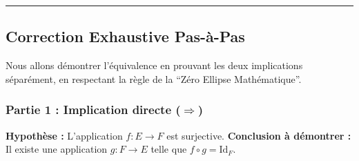 \documentclass[12pt,a4paper]{report}
\begin{document}
\begin{center}\rule{0.5\linewidth}{0.5pt}\end{center}

\subsection{Correction Exhaustive
Pas-à-Pas}\label{correction-exhaustive-pas-uxe0-pas}

Nous allons démontrer l'équivalence en prouvant les deux implications
séparément, en respectant la règle de la ``Zéro Ellipse Mathématique''.

\subsubsection{\texorpdfstring{Partie 1 : Implication directe
(\(\Rightarrow\))}{Partie 1 : Implication directe (\textbackslash Rightarrow)}}\label{partie-1-implication-directe-rightarrow}

\textbf{Hypothèse :} L'application \(f: E \to F\) est surjective.
\textbf{Conclusion à démontrer :} Il existe une application
\(g: F \to E\) telle que \(f \circ g = \text{Id}_F\).
\end{document}
